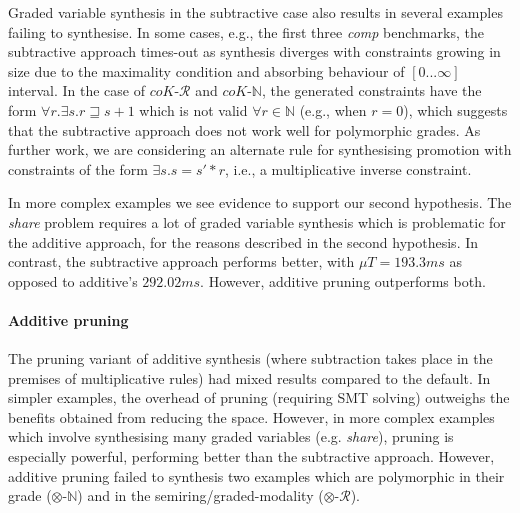 Graded variable synthesis in the subtractive case also results
in several examples failing to synthesise. In some cases, e.g.,
the first three \textit{comp} benchmarks, the subtractive approach
times-out as synthesis diverges with constraints growing in size
due to the maximality condition and absorbing behaviour of
$[   0   ...   \infty   ]$ interval. In the case of $\textit{coK-$\mathcal{R}$}$
and $\textit{coK-$\mathbb{N}$}$, the generated constraints
have the form $\forall r. \exists s. r \sqsupseteq s + 1 $ which
is not valid $\forall r \in \mathbb{N}$ (e.g., when $r = 0$),
which suggests that the subtractive approach does not work well for
polymorphic grades. As further work, we are
considering an alternate rule for synthesising promotion with
constraints of the form $\exists s . s = s' * r$, i.e.,
a multiplicative inverse constraint.

In more complex examples we see evidence to support
our second hypothesis. The \textit{share} problem requires a lot
of graded variable synthesis which is problematic for the additive
approach, for the reasons described in the second hypothesis. In contrast, the subtractive approach
performs better, with $\mu{T} = 193.3\textit{ms}$ as opposed to additive's
$292.02\textit{ms}$. However, additive pruning outperforms both.


\paragraph{Additive pruning}
The pruning variant of additive synthesis (where subtraction
takes place in the premises of multiplicative rules) had mixed results
compared to the default. In simpler examples, the overhead of pruning
(requiring SMT solving) outweighs
the benefits obtained from reducing the space. However, in more
complex examples which involve synthesising many graded variables (e.g. \textit{share}), pruning is
especially powerful, performing better than the subtractive
approach. However, additive pruning failed to synthesis two
 examples which are polymorphic in their grade
 ($\otimes$-$\mathbb{N}$) and in the semiring/graded-modality ($\otimes$-$\mathcal{R}$).


